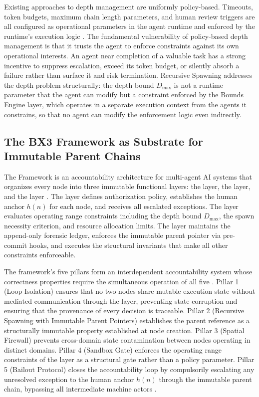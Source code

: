 Existing approaches to depth management are uniformly policy-based.  Timeouts, token budgets, maximum chain length parameters, and human review triggers are all configured as operational parameters in the agent runtime and enforced by the runtime's execution logic \cite{multi_agent_coordination_strategies}.  The fundamental vulnerability of policy-based depth management is that it trusts the agent to enforce constraints against its own operational interests.  An agent near completion of a valuable task has a strong incentive to suppress escalation, exceed its token budget, or silently absorb a failure rather than surface it and risk termination.  Recursive Spawning addresses the depth problem structurally: the depth bound $D_{\max}$ is not a runtime parameter that the agent can modify but a constraint enforced by the \bxthree{} Bounds Engine layer, which operates in a separate execution context from the agents it constrains, so that no agent can modify the enforcement logic even indirectly.

\subsection{The BX3 Framework as Substrate for Immutable Parent Chains}\label{sec:bx3-substrate}

The \bxthree{} Framework is an accountability architecture for multi-agent AI systems that organizes every node into three immutable functional layers: the \purpose{} layer, the \bounds{} layer, and the \fact{} layer \cite{bx3framework}.  The \purpose{} layer defines authorization policy, establishes the human anchor $h(n)$ for each node, and receives all escalated exceptions.  The \bounds{} layer evaluates operating range constraints including the depth bound $D_{\max}$, the spawn necessity criterion, and resource allocation limits.  The \fact{} layer maintains the append-only forensic ledger, enforces the immutable parent pointer via pre-commit hooks, and executes the structural invariants that make all other constraints enforceable.

The framework's five pillars form an interdependent accountability system whose correctness properties require the simultaneous operation of all five \cite{bx3framework}.  Pillar 1 (Loop Isolation) ensures that no two nodes share mutable execution state without mediated communication through the \fact{} layer, preventing state corruption and ensuring that the provenance of every decision is traceable.  Pillar 2 (Recursive Spawning with Immutable Parent Pointers) establishes the parent reference as a structurally immutable property established at node creation.  Pillar 3 (Spatial Firewall) prevents cross-domain state contamination between nodes operating in distinct domains.  Pillar 4 (Sandbox Gate) enforces the operating range constraints of the \bounds{} layer as a structural gate rather than a policy parameter.  Pillar 5 (Bailout Protocol) closes the accountability loop by compulsorily escalating any unresolved exception to the human anchor $h(n)$ through the immutable parent chain, bypassing all intermediate machine actors \cite{bx3framework}.

